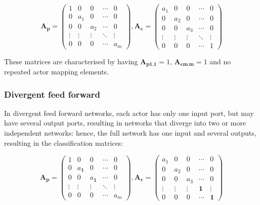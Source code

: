 \begin{equation}
\textbf{A}_{\textbf{p}}=
\begin{pmatrix}
  1 & 0 & 0 & \cdots & 0 \\
  0 & a_{1} & 0& \cdots & 0 \\
  0 & 0 & a_{2} & \cdots & 0 \\
  \vdots  & \vdots  & \vdots & \ddots & \vdots  \\
  0 & 0 & 0& \cdots & a_{m} 
 \end{pmatrix}
,
\textbf{A}_{\textbf{c}}=
\begin{pmatrix}
  a_{1} & 0 & 0 & \cdots & 0 \\
  0 & a_{2} & 0& \cdots & 0 \\
  0 & 0 & a_{3} & \cdots & 0 \\
  \vdots  & \vdots  & \vdots & \ddots & \vdots  \\
  0 & 0 & 0& \cdots & 1 
 \end{pmatrix}
\end{equation} 

These matrices are characterised by having $\textbf{A}_{\textbf{p1,1}}=1$, $\textbf{A}_{\textbf{cm,m}}=1$ and no repeated actor mapping elements. 

\subsubsection{Divergent feed forward}

In divergent feed forward networks, each actor has only one input port, but may have several output ports, resulting in networks that diverge into two or more independent networks: hence, the full network has one input and several outputs, resulting in the classification matrices:

\begin{equation}
\textbf{A}_{\textbf{p}}=
\begin{pmatrix}
  1 & 0 & 0 & \cdots & 0 \\
  0 & a_{\textbf{1}} & 0& \cdots & 0 \\
  0 & 0 & a_{\textbf{1}} & \cdots & 0 \\
  \vdots  & \vdots  & \vdots & \ddots & \vdots  \\
  0 & 0 & 0& \cdots & a_{m} 
 \end{pmatrix}
,
\textbf{A}_{\textbf{c}}=
\begin{pmatrix}
  a_{1} & 0 & 0 & \cdots & 0 \\
  0 & a_{2} & 0& \cdots & 0 \\
  0 & 0 & a_{3} & \cdots & 0 \\
  \vdots  & \vdots  & \vdots & \textbf{1} & \vdots  \\
  0 & 0 & 0& \cdots & \textbf{1} 
 \end{pmatrix}
\end{equation} 

